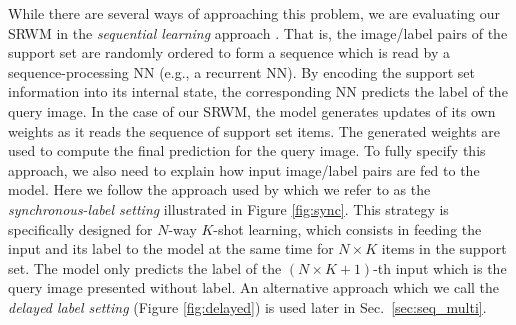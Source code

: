 \documentclass[nohyperref]{article}
\theoremstyle{plain}
\theoremstyle{definition}
\theoremstyle{remark}
\begin{document}
While there are several ways of approaching this problem, we are evaluating our SRWM
in the \textit{sequential learning} approach \citep{SantoroBBWL16, hochreiter2001learning}.
That is, the image/label pairs of the support set are randomly ordered
to form a sequence which is read by a sequence-processing NN (e.g., a recurrent NN).
By encoding the support set information into its internal state, the corresponding NN predicts the label of the query image.
In the case of our SRWM, the model generates updates of its own weights
as it reads the sequence of support set items.
The generated weights are used to compute the final prediction for the query image.
To fully specify this approach, we also need to explain how input image/label pairs are fed to the model.
Here we follow the approach used by \citet{mishra2018a} which we refer to as the \textit{synchronous-label setting} illustrated in Figure \ref{fig:sync}.
This strategy is specifically designed for $N$-way $K$-shot learning,
which consists in feeding the input and its label to the model at the same time for $N \times K$ items in the support set.
The model only predicts the label of the $(N \times K+1)$-th input which is the query image presented without label.
An alternative approach \citep{SantoroBBWL16} which we call the \textit{delayed label setting} (Figure \ref{fig:delayed})
is used later in Sec.~\ref{sec:seq_multi}.
\end{document}
